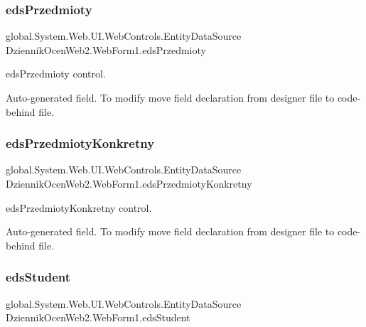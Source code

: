 \subsubsection{\texorpdfstring{eds\+Przedmioty}{edsPrzedmioty}}
{\footnotesize\ttfamily global.\+System.\+Web.\+U\+I.\+Web\+Controls.\+Entity\+Data\+Source Dziennik\+Ocen\+Web2.\+Web\+Form1.\+eds\+Przedmioty\hspace{0.3cm}{\ttfamily [protected]}}



eds\+Przedmioty control. 

Auto-\/generated field. To modify move field declaration from designer file to code-\/behind file. \mbox{\label{class_dziennik_ocen_web2_1_1_web_form1_a33092eb5bfd56d84a256312d7c6e1b49}} 
\subsubsection{\texorpdfstring{eds\+Przedmioty\+Konkretny}{edsPrzedmiotyKonkretny}}
{\footnotesize\ttfamily global.\+System.\+Web.\+U\+I.\+Web\+Controls.\+Entity\+Data\+Source Dziennik\+Ocen\+Web2.\+Web\+Form1.\+eds\+Przedmioty\+Konkretny\hspace{0.3cm}{\ttfamily [protected]}}



eds\+Przedmioty\+Konkretny control. 

Auto-\/generated field. To modify move field declaration from designer file to code-\/behind file. \mbox{\label{class_dziennik_ocen_web2_1_1_web_form1_a24e676704e911424646f8dcf6da4168a}} 
\subsubsection{\texorpdfstring{eds\+Student}{edsStudent}}
{\footnotesize\ttfamily global.\+System.\+Web.\+U\+I.\+Web\+Controls.\+Entity\+Data\+Source Dziennik\+Ocen\+Web2.\+Web\+Form1.\+eds\+Student\hspace{0.3cm}{\ttfamily [protected]}}



